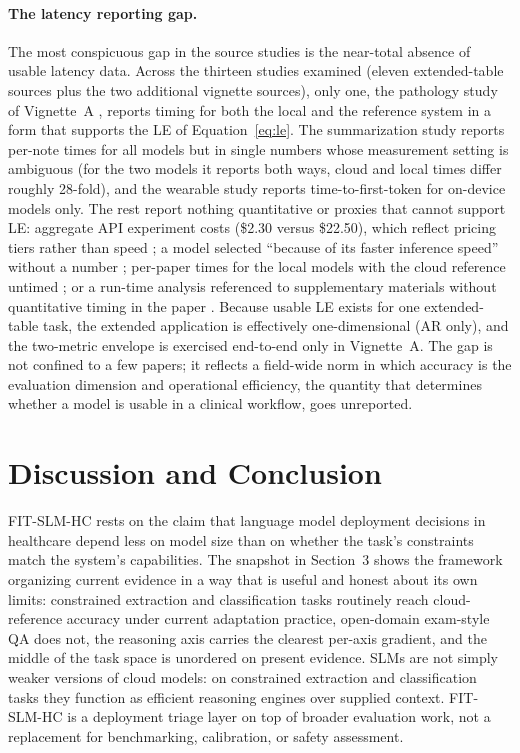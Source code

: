 \documentclass[11pt]{article}
\begin{document}
\paragraph{The latency reporting gap.}
The most conspicuous gap in the source studies is the near-total absence of usable latency data. Across the thirteen studies examined (eleven extended-table sources plus the two additional vignette sources), only one, the pathology study of Vignette~A \cite{Grothey2025}, reports timing for both the local and the reference system in a form that supports the LE of Equation~\ref{eq:le}. The summarization study \cite{Naemi2025} reports per-note times for all models but in single numbers whose measurement setting is ambiguous (for the two models it reports both ways, cloud and local times differ roughly 28-fold), and the wearable study \cite{Wang2025} reports time-to-first-token for on-device models only. The rest report nothing quantitative or proxies that cannot support LE: aggregate API experiment costs (\$2.30 versus \$22.50), which reflect pricing tiers rather than speed \cite{Hanafi2024}; a model selected ``because of its faster inference speed'' without a number \cite{Kim2025}; per-paper times for the local models with the cloud reference untimed \cite{Dawood2025}; or a run-time analysis referenced to supplementary materials without quantitative timing in the paper \cite{Wu2025MedS}. Because usable LE exists for one extended-table task, the extended application is effectively one-dimensional (AR only), and the two-metric envelope is exercised end-to-end only in Vignette~A. The gap is not confined to a few papers; it reflects a field-wide norm in which accuracy is the evaluation dimension and operational efficiency, the quantity that determines whether a model is usable in a clinical workflow, goes unreported.

\section{Discussion and Conclusion}

FIT-SLM-HC rests on the claim that language model deployment decisions in healthcare depend less on model size than on whether the task's constraints match the system's capabilities. The snapshot in Section~3 shows the framework organizing current evidence in a way that is useful and honest about its own limits: constrained extraction and classification tasks routinely reach cloud-reference accuracy under current adaptation practice, open-domain exam-style QA does not, the reasoning axis carries the clearest per-axis gradient, and the middle of the task space is unordered on present evidence. SLMs are not simply weaker versions of cloud models: on constrained extraction and classification tasks they function as efficient reasoning engines over supplied context. FIT-SLM-HC is a deployment triage layer on top of broader evaluation work, not a replacement for benchmarking, calibration, or safety assessment.
\end{document}
